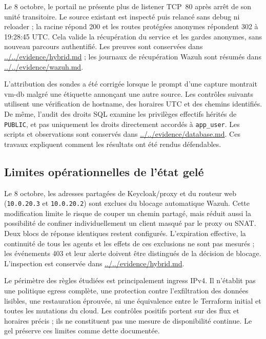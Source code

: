 \documentclass[a4paper,12pt]{report}
\begin{document}
Le 8 octobre, le portail ne présente plus de listener TCP~80 après arrêt de son unité transitoire. Le source existant est inspecté puis relancé sans debug ni reloader ; la racine répond 200 et les routes protégées anonymes répondent 302 à 19:28:45 UTC. Cela valide la récupération du service et les gardes anonymes, sans nouveau parcours authentifié. Les preuves sont conservées dans \url{../../evidence/hybrid.md} ; les journaux de récupération Wazuh sont résumés dans \url{../../evidence/wazuh.md}.

L'attribution des sondes a été corrigée lorsque le prompt d'une capture montrait vm-db malgré une étiquette annonçant une autre source. Les contrôles suivants utilisent une vérification de hostname, des horaires UTC et des chemins identifiés. De même, l'audit des droits SQL examine les privilèges effectifs hérités de \texttt{PUBLIC}, et pas uniquement les droits directement accordés à \texttt{app\_user}. Les scripts et observations sont conservés dans \url{../../evidence/database.md}. Ces travaux expliquent comment les résultats ont été rendus défendables.

\subsection{Limites opérationnelles de l'état gelé}
Le 8 octobre, les adresses partagées de Keycloak/proxy et du routeur web (\texttt{10.0.20.3} et \texttt{10.0.20.2}) sont exclues du blocage automatique Wazuh. Cette modification limite le risque de couper un chemin partagé, mais réduit aussi la possibilité de confiner individuellement un client masqué par le proxy ou SNAT. Deux blocs de réponse identiques restent configurés. L'expiration effective, la continuité de tous les agents et les effets de ces exclusions ne sont pas mesurés ; les événements 403 et leur alerte doivent être distingués de la décision de blocage. L'inspection est conservée dans \url{../../evidence/hybrid.md}.

Le périmètre des règles étudiées est principalement ingress IPv4. Il n'établit pas une politique egress complète, une protection contre l'exfiltration des données lisibles, une restauration éprouvée, ni une équivalence entre le Terraform initial et toutes les mutations du cloud. Les contrôles positifs portent sur des flux et horaires précis ; ils ne constituent pas une mesure de disponibilité continue. Le gel préserve ces limites comme dette documentée.
\end{document}
